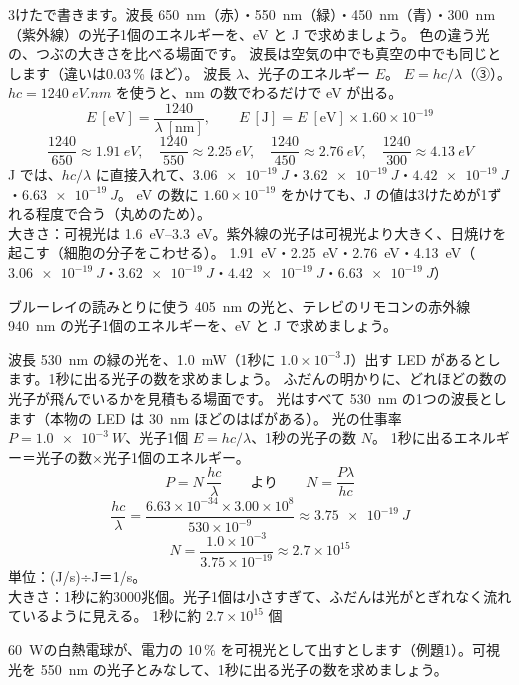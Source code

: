 \label{ph:原-2:ex2}
\begin{phreidai}
3けたで書きます。波長 \qty{650}{nm}（赤）・\qty{550}{nm}（緑）・\qty{450}{nm}（青）・\qty{300}{nm}（紫外線）の光子1個のエネルギーを、eV と J で求めましょう。
\phbamen
色の違う光の、つぶの大きさを比べる場面です。
\phmushi
波長は空気の中でも真空の中でも同じとします（違いは0.03\,\% ほど）。
\phzu
波長 $\lambda$、光子のエネルギー $E$。
\phriyu
$E=hc/\lambda$（③）。$hc=\qty{1240}{eV.nm}$ を使うと、nm の数でわるだけで eV が出る。
\phtateru
\[ E\ [\mathrm{eV}]=\frac{1240}{\lambda\ [\mathrm{nm}]},\qquad E\ [\mathrm J]=E\ [\mathrm{eV}]\times1.60\times10^{-19} \]
\phtoku
\[ \frac{1240}{650}\approx\qty{1.91}{eV},\quad\frac{1240}{550}\approx\qty{2.25}{eV},\quad\frac{1240}{450}\approx\qty{2.76}{eV},\quad\frac{1240}{300}\approx\qty{4.13}{eV} \]
J では、$hc/\lambda$ に直接入れて、$\qty{3.06e-19}{J}$・$\qty{3.62e-19}{J}$・$\qty{4.42e-19}{J}$・$\qty{6.63e-19}{J}$。
\phtashikame
eV の数に $1.60\times10^{-19}$ をかけても、J の値は3けためが1ずれる程度で合う（丸めのため）。\\
大きさ：可視光は \qtyrange{1.6}{3.3}{eV}。紫外線の光子は可視光より大きく、日焼けを起こす（細胞の分子をこわせる）。
\kotae \qty{1.91}{eV}・\qty{2.25}{eV}・\qty{2.76}{eV}・\qty{4.13}{eV}（$\qty{3.06e-19}{J}$・$\qty{3.62e-19}{J}$・$\qty{4.42e-19}{J}$・$\qty{6.63e-19}{J}$）
\end{phreidai}
\begin{jibun}
ブルーレイの読みとりに使う \qty{405}{nm} の光と、テレビのリモコンの赤外線 \qty{940}{nm} の光子1個のエネルギーを、eV と J で求めましょう。
\end{jibun}

\label{ph:原-2:ex3}
\begin{phreidai}
波長 \qty{530}{nm} の緑の光を、\qty{1.0}{mW}（1秒に $1.0\times10^{-3}$\,J）出す LED があるとします。1秒に出る光子の数を求めましょう。
\phbamen
ふだんの明かりに、どれほどの数の光子が飛んでいるかを見積もる場面です。
\phmushi
光はすべて \qty{530}{nm} の1つの波長とします（本物の LED は \qty{30}{nm} ほどのはばがある）。
\phzu
光の仕事率 $P=\qty{1.0e-3}{W}$、光子1個 $E=hc/\lambda$、1秒の光子の数 $N$。
\phriyu
1秒に出るエネルギー＝光子の数×光子1個のエネルギー。
\phtateru
\[ P=N\,\frac{hc}{\lambda}\qquad\text{より}\qquad N=\frac{P\lambda}{hc} \]
\phtoku
\[ \frac{hc}{\lambda}=\frac{6.63\times10^{-34}\times3.00\times10^8}{530\times10^{-9}}\approx\qty{3.75e-19}{J} \]
\[ N=\frac{1.0\times10^{-3}}{3.75\times10^{-19}}\approx2.7\times10^{15} \]
\phtashikame
単位：(J/s)÷J＝1/s。\\
大きさ：1秒に約3000兆個。光子1個は小さすぎて、ふだんは光がとぎれなく流れているように見える。
\kotae 1秒に約 $2.7\times10^{15}$ 個
\end{phreidai}
\begin{jibun}
\qty{60}{W}の白熱電球が、電力の 10\,\% を可視光として出すとします（例題1）。可視光を \qty{550}{nm} の光子とみなして、1秒に出る光子の数を求めましょう。
\end{jibun}

